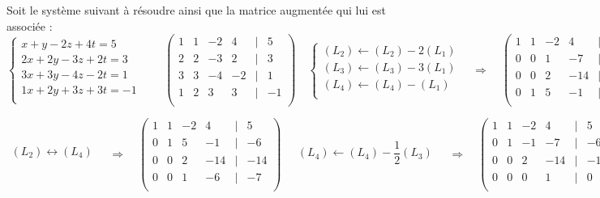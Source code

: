 {\begin{exemple}
\footnotesize
Soit le système suivant à résoudre ainsi que la matrice augmentée qui lui est associée : 
$$
\left\{
\begin{array}{l}
x   + y  -2 z +4t = 5 \\
2x + 2y -3 z +2t = 3 \\
3x + 3y -4 z -2t = 1 \\
1x + 2y +3 z +3t = -1 \\
\end{array}
\right.
\quad\quad
\begin{pmatrix}
1 & 1 & -2 & 4 & | & 5 \\
2 & 2 & -3 & 2 & | &  3 \\
3 & 3 & -4 &  -2& | & 1 \\
1 & 2 & 3 & 3 & | & -1 \\
\end{pmatrix}
\quad \left\{
\begin{array}{l}
(L_2) \leftarrow (L_2) - 2 (L_1) \\ 
(L_3) \leftarrow (L_3) - 3 (L_1) \\
(L_4) \leftarrow (L_4) -  (L_1) \\
\end{array}
\right.
\quad\Longrightarrow \quad
\begin{pmatrix}
1 & 1 & -2 & 4 & | & 5 \\
0 & 0 & 1 & -7 & | &  -6 \\
0 & 0 & 2 &  -14& | & -14 \\
0 & 1 & 5 & -1 & | & -6 \\
\end{pmatrix}
$$


$$
\begin{array}{l}
(L_2) \leftrightarrow (L_4)  \\ 
\end{array}
\quad\Longrightarrow \quad
\begin{pmatrix}
1 & 1 & -2 & 4 & | & 5 \\
0 & 1 & 5 & -1 & | & -6 \\
0 & 0 & 2 &  -14& | & -14 \\
0 & 0 & 1 & -6 & | &  -7 \\
\end{pmatrix}
%
\quad
\begin{array}{l}
(L_4) \leftarrow (L_4) - \dfrac{1}{2} (L_3)\\ 
\end{array}
\quad\Longrightarrow \quad
\begin{pmatrix}
1 & 1 & -2 & 4 & | & 5 \\
0 & 1 & -1 & -7 & | & -6 \\
0 & 0 & 2 &  -14& | & -14 \\
0 & 0 & 0 & 1 & | &  0 \\
\end{pmatrix}
$$
\normalsize


\end{exemple}}
